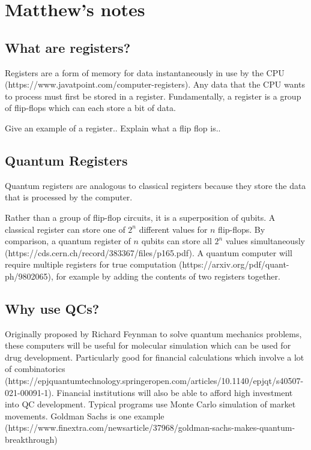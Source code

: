 \section{Matthew's notes}

\subsection{What are registers?}
Registers are a form of memory for data instantaneously in use by the CPU (https://www.javatpoint.com/computer-registers). Any data that the CPU wants to process must first be stored in a register. Fundamentally, a register is a group of flip-flops which can each store a bit of data. 

Give an example of a register..
Explain what a flip flop is..

\subsection{Quantum Registers}
Quantum registers are analogous to classical registers because they store the data that is processed by the computer. 

Rather than a group of flip-flop circuits, it is a superposition of qubits. A classical register can store one of $2^n$ different values for $n$ flip-flops. By comparison, a quantum register of $n$ qubits can store all $2^n$ values simultaneously (https://cds.cern.ch/record/383367/files/p165.pdf). A quantum computer will require multiple registers for true computation (https://arxiv.org/pdf/quant-ph/9802065), for example by adding the contents of two registers together.

\subsection{Why use QCs?}
Originally proposed by Richard Feynman to solve quantum mechanics problems, these computers will be useful for molecular simulation which can be used for drug development. Particularly good for financial calculations which involve a lot of combinatorics (https://epjquantumtechnology.springeropen.com/articles/10.1140/epjqt/s40507-021-00091-1). Financial institutions will also be able to afford high investment into QC development. Typical programs use Monte Carlo simulation of market movements. Goldman Sachs is one example (https://www.finextra.com/newsarticle/37968/goldman-sachs-makes-quantum-breakthrough)

